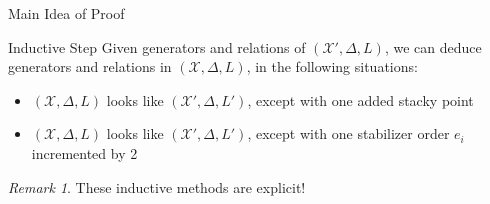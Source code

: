 \documentclass{beamer}
\theoremstyle{remark}
\newtheorem{rem}[thm]{Remark}
\newcommand \sx{{\mathscr X}}
\newcommand{\halfcan}{L}
\begin{document}
\begin{frame}{Main Idea of Proof}

\begin{block}{Inductive Step}
Given generators and relations of $(\sx', \Delta, \halfcan)$, we can deduce generators and relations in $(\sx, \Delta, \halfcan)$, in the following situations:
\begin{itemize}
\item $(\sx, \Delta, \halfcan)$ looks like $(\sx', \Delta, \halfcan')$, except with one added stacky point
\item $(\sx, \Delta, \halfcan)$ looks like $(\sx', \Delta, \halfcan')$, except with one stabilizer order $e_i$ incremented by 2
\end{itemize}
\end{block}

\begin{rem}
These inductive methods are explicit!
\end{rem}

\end{frame}
\end{document}
